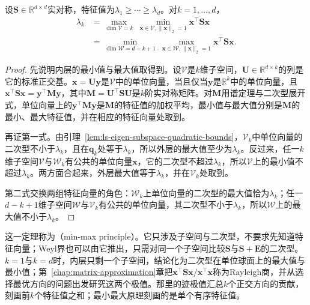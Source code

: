 \begin{theorem}
\label{thm:matrix-analysis-courant-fischer}
\label{eq:matrix-analysis-courant-fischer}
设$\bm S\in\mathbb R^{d\times d}$实对称，特征值为$\lambda_1\geq\cdots\geq\lambda_d$。对$k=1,\ldots,d$，
\begin{equation*}
\begin{aligned}
 \lambda_k
 &=\max_{\dim\mathcal V=k}\ \min_{\bm x\in\mathcal V,\lVert\bm x\rVert_2=1}\bm x^\top\bm S\bm x\\
 &=\min_{\dim\mathcal W=d-k+1}\ \max_{\bm x\in\mathcal W,\lVert\bm x\rVert_2=1}\bm x^\top\bm S\bm x .
\end{aligned}
\end{equation*}
\end{theorem}
\begin{proof}
先说明内层的最小值与最大值取得到。设$\mathcal V$是$k$维子空间，$\bm U\in\mathbb R^{d\times k}$的列是它的标准正交基。$\bm x=\bm U\bm y$是$\mathcal V$中的单位向量，当且仅当$\bm y$是$\mathbb R^k$中的单位向量，且$\bm x^\top\bm S\bm x=\bm y^\top\bm M\bm y$，其中$\bm M=\bm U^\top\bm S\bm U$是$k$阶实对称矩阵。对$\bm M$用谱定理与二次型展开式，单位向量上的$\bm y^\top\bm M\bm y$是$\bm M$的特征值的加权平均，最小值与最大值分别是$\bm M$的最小、最大特征值，并在相应的特征向量处取到。

再证第一式。由引理~\ref{lem:ls-eigen-subspace-quadratic-bounds}，$\mathcal V_k$中单位向量的二次型不小于$\lambda_k$，且在$\bm q_k$处等于$\lambda_k$，所以外层的最大值至少为$\lambda_k$。反过来，任一$k$维子空间$\mathcal V$与$\mathcal W_k$有公共的单位向量$\bm x$，它的二次型不超过$\lambda_k$，所以$\mathcal V$上的最小值不超过$\lambda_k$。两方面合起来，外层最大值等于$\lambda_k$，并在$\mathcal V_k$处取到。

第二式交换两组特征向量的角色：$\mathcal W_k$上单位向量的二次型的最大值恰为$\lambda_k$；任一$d-k+1$维子空间$\mathcal W$与$\mathcal V_k$有公共的单位向量，其二次型不小于$\lambda_k$，所以$\mathcal W$上的最大值不小于$\lambda_k$。
\end{proof}

这一定理称为（min-max principle）。它只涉及子空间与二次型，不要求先知道特征向量；Weyl界也可以由它推出，只需对同一个子空间比较$\bm S$与$\bm S+\bm E$的二次型。$k=1$与$k=d$时，内层只剩一个子空间，结论化为二次型在单位球面上的最大值与最小值；第~\ref{chap:matrix-approximation}章把$\bm x^\top\bm S\bm x/\bm x^\top\bm x$称为Rayleigh商，并从选择最优方向的问题出发研究这两个极值。那里的迹极值汇总$k$个正交方向的贡献，刻画前$k$个特征值之和；最小最大原理刻画的是单个有序特征值。

